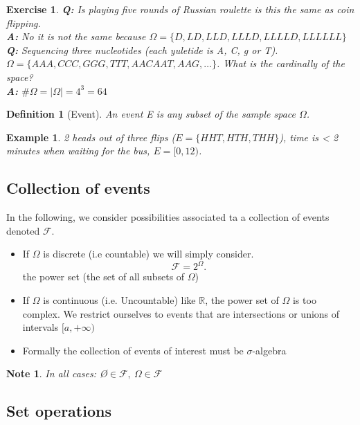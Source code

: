 \documentclass[a4paper]{article}
\newcounter{counter}
\numberwithin{counter}{subsection}
\theoremstyle{break}
\newtheorem{definition}{Definition}
\newtheorem{exmp}[counter]{Example}
\newtheorem{exe}[counter]{Exercise}
\begin{document}
\begin{exe}
    \textbf{Q:} Is playing five rounds of Russian roulette is this the same as coin flipping.\\
    \textbf{A:} No it is not the same because $\Omega = \{D, LD, LLD, LLLD, LLLLD, LLLLLL\}$\\
    \textbf{Q:} Sequencing three nucleotides (each yuletide is A, C, g or T).\\
	$\Omega = \{AAA, CCC, GGG, TTT, AAC AAT, AAG, \ldots \}$. What is the cardinally of the space?\\
	\textbf{A:} $\#\Omega = |\Omega|= 4^3 = 64$
\end{exe}

\begin{definition}[Event]
	An event E is any subset of the sample space $\Omega$.
\end{definition}

\begin{exmp}
    2 heads out of three flips ($E = \{HHT, HTH, THH\}$), time is < 2 minutes when waiting for the bus, $E = [0,12)$.
\end{exmp}

\subsection{Collection of events}%
\label{sub:collection_of_events}

In the following, we consider possibilities associated ta a collection of events denoted $\mathcal{F}$.
\begin{itemize}
	\item If $\Omega$ is discrete (i.e countable) we will simply consider. \[
	\mathcal{F} = 2^{\Omega}
	.\] 
	the power set (the set of all subsets of $\Omega$) 
\item If $\Omega$ is continuous (i.e. Uncountable) like $\mathbb{R}$, the power set of $\Omega$ is too complex.
	We restrict ourselves to events that are intersections or unions of intervals $[a, +\infty)$
	\item Formally the collection of events of interest must be $\sigma$-algebra
\end{itemize}

\newtheorem{note}{Note}
\begin{note}
	In all cases: \O $\in \mathcal{F}, \: \Omega \in \mathcal{F}$
\end{note}

\newpage
\subsection{Set operations}%
\label{sub:set_operations}
\end{document}
